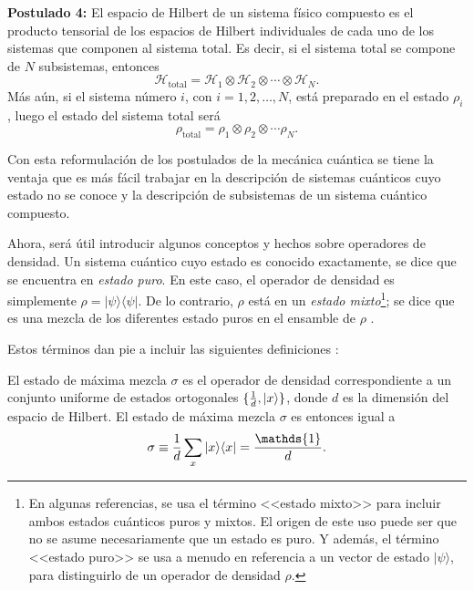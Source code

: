 \textbf{Postulado 4:} El espacio de Hilbert de un sistema físico compuesto es el producto tensorial de los espacios de Hilbert individuales de cada uno de los sistemas que componen al sistema total. Es decir, si el sistema total se compone de $N$ subsistemas, entonces \begin{equation}\label{Htotal4postulado}
	\mathcal{H}_{\text{total}}=\mathcal{H}_1\otimes \mathcal{H}_2\otimes \cdots \otimes \mathcal{H}_N.
\end{equation}
  Más aún, si el sistema número $i$, con $i=1,2,\ldots,N$, está preparado en el estado $\rho_i$, luego el estado del sistema total será  \begin{equation}\label{rhototal4postulado}
	\rho_{\text{total}}=\rho_1\otimes \rho_2 \otimes \cdots \rho_N.
\end{equation}


\setlength{\leftskip}{0pt}

Con esta reformulación de los postulados de la mecánica cuántica se tiene la ventaja que es más fácil trabajar en la descripción de sistemas cuánticos cuyo estado no se conoce y la descripción de subsistemas de un sistema cuántico compuesto.


Ahora, será útil introducir algunos conceptos y hechos sobre operadores de densidad. Un sistema cuántico cuyo estado es conocido exactamente, se dice que se encuentra en \textit{estado puro}. En este caso, el operador de densidad es simplemente $\rho=|\psi \rangle \langle \psi|$. De lo contrario, $\rho$ está en un \textit{estado mixto}\footnote{En algunas referencias, se  usa el término <<estado mixto>> para incluir ambos estados cuánticos puros y mixtos. El origen de este uso puede ser que no se asume necesariamente que un estado es puro. Y además, el término <<estado puro>> se usa a menudo en referencia a un vector de estado $|\psi\rangle $, para distinguirlo de un operador de densidad	$\rho$. }; se dice que es una mezcla de los diferentes estado puros en el ensamble de $\rho$ {\cite{nielsen_chuang_2010}}. 

Estos términos dan pie a incluir las siguientes definiciones {\cite{wilde2011classical}}: \begin{definition} El estado de máxima mezcla $\sigma$ es el operador de densidad correspondiente a un conjunto uniforme de estados ortogonales $\{\frac{1}{d},|x\rangle\}$, donde $d$ es la dimensión del espacio de Hilbert. El estado de máxima mezcla $\sigma$ es entonces igual a 	\begin{equation}\label{maximallyMixedState}
		\sigma \equiv \dfrac{1}{d}\sum_x|x\rala x|=\dfrac{\mathds{1}}{d}.
	\end{equation}
\end{definition}



